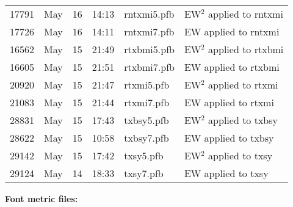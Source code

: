 \documentclass[10pt]{amsart}
\begin{document}
\begin{center}
\begin{tabular}{@{} rlrrll @{}}
17791&May&16&14:13&rntxmi5.pfb& EW${}^2$ applied to rntxmi\\
17726&May&16&14:11&rntxmi7.pfb& EW applied to rntxmi\\
16562&May&15&21:49&rtxbmi5.pfb& EW${}^2$ applied to rtxbmi\\
16605&May&15&21:51&rtxbmi7.pfb& EW applied to rtxbmi\\
20920&May&15&21:47&rtxmi5.pfb& EW${}^2$ applied to rtxmi\\
21083&May&15&21:44&rtxmi7.pfb& EW applied to rtxmi\\
28831&May&15&17:43&txbsy5.pfb& EW${}^2$ applied to txbsy\\
28622&May&15&10:58&txbsy7.pfb& EW applied to txbsy\\
29142&May&15&17:42&txsy5.pfb& EW${}^2$ applied to txsy\\
29124&May&14&18:33&txsy7.pfb& EW applied to txsy\\
    \bottomrule
  \end{tabular}
\end{center}

\textbf{Font metric files:}
\end{document}
